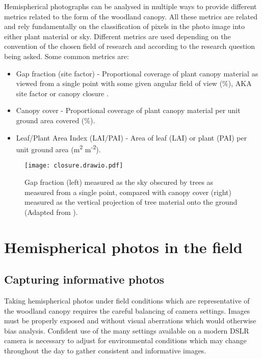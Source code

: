 \documentclass{article}
\begin{document}
Hemispherical photographs can be analysed in multiple ways to provide different metrics related to the form of the woodland canopy. All these metrics are related and rely fundamentally on the classification of pixels in the photo image into either plant material or sky. Different metrics are used depending on the convention of the chosen field of research and according to the research question being asked. Some common metrics are:

\begin{itemize}
	\item{Gap fraction (site factor) - Proportional coverage of plant canopy material as viewed from a single point with some given angular field of view (\%), AKA site factor or canopy closure \citep{Anderson1964}.}
	\item{Canopy cover - Proportional coverage of plant canopy material per unit ground area covered (\%).}
	\item{Leaf/Plant Area Index (LAI/PAI) - Area of leaf (LAI) or plant (PAI) per unit ground area (m\textsuperscript{2} m\textsuperscript{-2}).}
\end{itemize}

\begin{figure}[H]
\centering
	\texttt{[image: closure.drawio.pdf]}
	\caption{Gap fraction (left) measured as the sky obscured by trees as measured from a single point, compared with canopy cover (right) measured as the vertical projection of tree material onto the ground (Adapted from \citealt{Jennings1999}).}
	\label{closure}
\end{figure}

\section{Hemispherical photos in the field}

\subsection{Capturing informative photos}

Taking hemispherical photos under field conditions which are representative of the woodland canopy requires the careful balancing of camera settings. Images must be properly exposed and without visual aberrations which would otherwise bias analysis. Confident use of the many settings available on a modern DSLR camera is necessary to adjust for environmental conditions which may change throughout the day to gather consistent and informative images.
\end{document}
